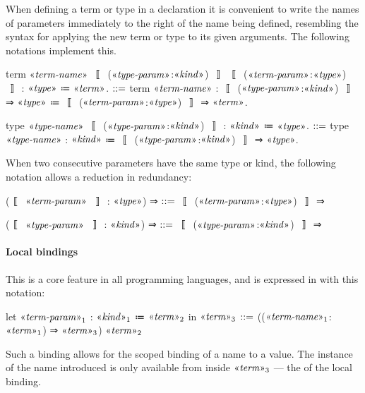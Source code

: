 \newpage
When defining a term or type in a declaration it is convenient to write the names of parameters immediately to the right of the name being defined, resembling the syntax for applying the new term or type to its given arguments.
The following notations implement this.
\begin{notational}[caption={Notation for declaration parameters}]
term $\mvar{term-name}$ $〚$ ($\mvar{type-param}$:$\mvar{kind}$) $〛$ $〚$ ($\mvar{term-param}$:$\mvar{type}$) $〛$
  : $\mvar{type}$ ≔ $\mvar{term}$.
    $\syneq$
      term $\mvar{term-name}$
        : $〚$ ($\mvar{type-param}$:$\mvar{kind}$) $〛$ ⇒ $\mvar{type}$
        ≔ $〚$ ($\mvar{term-param}$:$\mvar{type}$) $〛$ ⇒ $\mvar{term}$.

type $\mvar{type-name}$ $〚$ ($\mvar{type-param}$:$\mvar{kind}$) $〛$ : $\mvar{kind}$ ≔ $\mvar{type}$.
  $\syneq$
    type $\mvar{type-name}$ : $\mvar{kind}$ ≔ $〚$ ($\mvar{type-param}$:$\mvar{kind}$) $〛$ ⇒ $\mvar{type}$.
\end{notational}

When two consecutive parameters have the same type or kind, the following notation allows a reduction in redundancy:

\begin{notational}[caption={Notations for multiple shared-type and shared-kind parameters}]
($〚$ $\mvar{term-param}$ $〛$ : $\mvar{type}$) ⇒   $\syneq$   $〚$ ($\mvar{term-param}$:$\mvar{type}$) $〛$ ⇒

($〚$ $\mvar{type-param}$ $〛$ : $\mvar{kind}$) ⇒   $\syneq$   $〚$ ($\mvar{type-param}$:$\mvar{kind}$) $〛$ ⇒
\end{notational}

\paragraph{Local bindings}
This is a core feature in all programming languages, and is expressed in \LangA with this notation:
\begin{notational}[caption={Notation for local binding.}]
let $\mvar{term-param}_1$ : $\mvar{kind}_1$ ≔ $\mvar{term}_2$ in $\mvar{term}_3$
  $\syneq$
    (($\mvar{term-name}_1$:$\mvar{term}_1$) ⇒ $\mvar{term}_3$) $\mvar{term}_2$
\end{notational}
Such a binding allows for the scoped binding of a name to a value.
The instance of the name introduced is only available from inside $\mvar{term}_3$ --- the  of the local binding.

